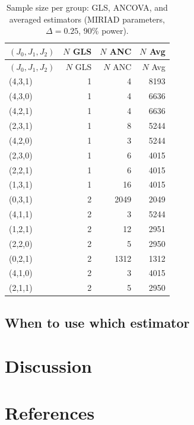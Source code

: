 \documentclass[
  11pt,
]{article}
\begin{document}
\begin{longtable}[]{@{}lrrr@{}}
\caption{Sample size per group: GLS, ANCOVA, and averaged estimators
(MIRIAD parameters, \(\Delta=0.25\), 90\% power).}\tabularnewline
\toprule\noalign{}
\((J_0,J_1,J_2)\) & \(N\) GLS & \(N\) ANC & \(N\) Avg \\
\midrule\noalign{}
\endfirsthead
\toprule\noalign{}
\((J_0,J_1,J_2)\) & \(N\) GLS & \(N\) ANC & \(N\) Avg \\
\midrule\noalign{}
\endhead
\bottomrule\noalign{}
\endlastfoot
(4,3,1) & 1 & 4 & 8193 \\
(4,3,0) & 1 & 4 & 6636 \\
(4,2,1) & 1 & 4 & 6636 \\
(2,3,1) & 1 & 8 & 5244 \\
(4,2,0) & 1 & 3 & 5244 \\
(2,3,0) & 1 & 6 & 4015 \\
(2,2,1) & 1 & 6 & 4015 \\
(1,3,1) & 1 & 16 & 4015 \\
(0,3,1) & 2 & 2049 & 2049 \\
(4,1,1) & 2 & 3 & 5244 \\
(1,2,1) & 2 & 12 & 2951 \\
(2,2,0) & 2 & 5 & 2950 \\
(0,2,1) & 2 & 1312 & 1312 \\
(4,1,0) & 2 & 3 & 4015 \\
(2,1,1) & 2 & 5 & 2950 \\
\end{longtable}

\subsection{When to use which
estimator}\label{when-to-use-which-estimator}

\section{Discussion}\label{discussion}

\section*{References}\label{references}
\end{document}
